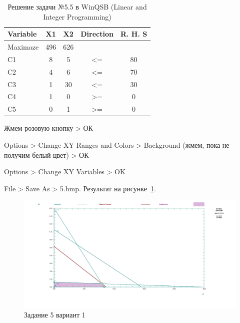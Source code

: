\begin{table}[p!]

  \centering

  \caption{Решение задачи №5.5 в WinQSB (Linear and Integer Programming)}
  \label{tab:5_5}

  \begin{tabular}{ |l||c|c|c|c| } 
    \hline
    Variable & X1 & X2 & Direction & R. H. S \\ \hline
    \hline
    Maximaze & 496 & 626 &  & \\ \hline
    C1 & 8 & 5 & <= & 80 \\ \hline
    C2 & 4 & 6 & <= & 70 \\ \hline
    C3 & 1 & 30 & <= & 30 \\ \hline
    C4 & 1 & 0 & >= & 0 \\ \hline
    C5 & 0 & 1 & >= & 0 \\ \hline
  \end{tabular}
\end{table}

Жмем розовую кнопку > ОК

Options > Change XY Ranges and Colors > Background (жмем, пока не получим белый цвет) > ОК

Options > Change XY Variables > OK

File > Save As > 5.bmp. Результат на рисунке~\ref{fig:result5_option1}.

\begin{figure}[p!]
  \centering

  \includegraphics[width=18cm]
  {inc/result5_option1.png}

  \caption{Задание 5 вариант 1}
  \label{fig:result5_option1}
\end{figure}

